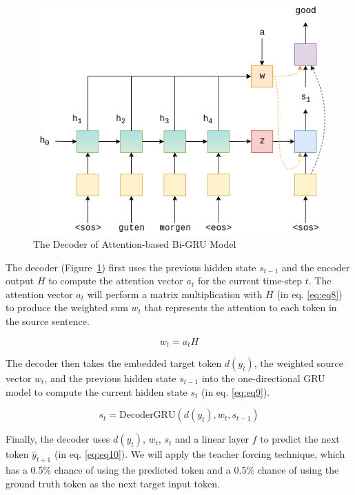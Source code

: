 \begin{figure}[h]
	\centering
	\includegraphics[scale=0.7]{../images/seq2seq_decoder_attention.png}
    \caption{The Decoder of Attention-based Bi-GRU Model}
	\label{fig:seq2seq_decoder}
\end{figure}

The decoder (Figure~\ref{fig:seq2seq_decoder}) first uses the previous hidden state $s_{t-1}$ and the encoder output $H$ to compute the attention vector $a_t$ for the current time-step $t$. The attention vector $a_t$ will perform a matrix multiplication with $H$ (in eq. \ref{eq:eq8}) to produce the weighted sum $w_t$ that represents the attention to each token in the source sentence.

\begin{equation}
    w_t = a_tH \label{eq:eq8}
\end{equation}

The decoder then takes the embedded target token $d(y_t)$, the weighted source vector $w_t$, and the previous hidden state $s_{t-1}$ into the one-directional GRU model to compute the current hidden state $s_t$ (in eq. \ref{eq:eq9}).

\begin{equation}
    s_t = \text{DecoderGRU}(d(y_t), w_t, s_{t-1}) \label{eq:eq9}
\end{equation}

Finally, the decoder uses $d(y_t)$, $w_t$, $s_t$ and a linear layer $f$ to predict the next token $\hat{y}_{t+1}$ (in eq. \ref{eq:eq10}). We will apply the teacher forcing technique, which has a 0.5\% chance of using the predicted token and a 0.5\% chance of using the ground truth token as the next target input token.

